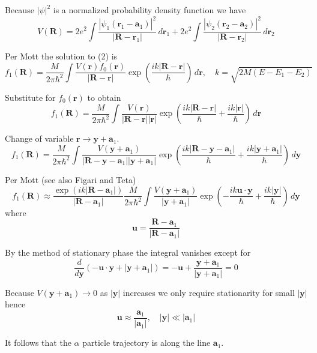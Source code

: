 \documentclass[12pt]{article}
\begin{document}
Because $|\psi|^2$ is a normalized probability density function we have
\begin{equation*}
V(\mathbf R)
=2e^2\int\frac{|\psi_1(\mathbf r_1-\mathbf a_1)|^2}{|\mathbf R-\mathbf r_1|}
\,d\mathbf r_1
+2e^2\int\frac{|\psi_2(\mathbf r_2-\mathbf a_2)|^2}{|\mathbf R-\mathbf r_2|}
\,d\mathbf r_2
\end{equation*}

Per Mott the solution to (2) is
\begin{equation*}
f_1(\mathbf R)=
\frac{M}{2\pi\hbar^2}\int\frac{V(\mathbf r)f_0(\mathbf r)}{|\mathbf R-\mathbf r|}
\exp\left(\frac{ik|\mathbf R-\mathbf r|}{\hbar}\right)\,d\mathbf r,
\quad
k=\sqrt{2M(E-E_1-E_2)}
\end{equation*}

Substitute for $f_0(\mathbf r)$ to obtain
\begin{equation*}
f_1(\mathbf R)=
\frac{M}{2\pi\hbar^2}\int\frac{V(\mathbf r)}{|\mathbf R-\mathbf r||\mathbf r|}
\exp\left(\frac{ik|\mathbf R-\mathbf r|}{\hbar}+\frac{ik|\mathbf r|}{\hbar}\right)\,d\mathbf r
\end{equation*}

Change of variable $\mathbf r\rightarrow\mathbf y+\mathbf a_1$.
\begin{equation*}
f_1(\mathbf R)=
\frac{M}{2\pi\hbar^2}\int
\frac{V(\mathbf y+\mathbf a_1)}{|\mathbf R-\mathbf y-\mathbf a_1||\mathbf y+\mathbf a_1|}
\exp\left(\frac{ik|\mathbf R-\mathbf y-\mathbf a_1|}{\hbar}
+\frac{ik|\mathbf y+\mathbf a_1|}{\hbar}\right)\,d\mathbf y
\end{equation*}

Per Mott (see also Figari and Teta)
\begin{equation*}
f_1(\mathbf R)\approx
\frac{\exp(ik|\mathbf R-\mathbf a_1|)}{|\mathbf R-\mathbf a_1|}
\frac{M}{2\pi\hbar^2}\int\frac{V(\mathbf y+\mathbf a_1)}{|\mathbf y+\mathbf a_1|}
\exp\left(-\frac{ik\mathbf u\cdot\mathbf y}{\hbar}+\frac{ik|\mathbf y|}{\hbar}\right)\,d\mathbf y
\tag{3}
\end{equation*}
where
\begin{equation*}
\mathbf u=\frac{\mathbf R-\mathbf a_1}{|\mathbf R-\mathbf a_1|}
\end{equation*}

By the method of stationary phase the integral vanishes except for
\begin{equation*}
\frac{d}{d\mathbf y}\left(-\mathbf u\cdot\mathbf y+|\mathbf y+\mathbf a_1|\right)
=-\mathbf u+\frac{\mathbf y+\mathbf a_1}{|\mathbf y+\mathbf a_1|}=0
\end{equation*}

Because $V(\mathbf y+\mathbf a_1)\rightarrow0$ as $|\mathbf y|$ increases
we only require stationarity for small $|\mathbf y|$ hence
\begin{equation*}
\mathbf u\approx\frac{\mathbf a_1}{|\mathbf a_1|},
\quad
|\mathbf y|\ll|\mathbf a_1|
\end{equation*}

It follows that the $\alpha$ particle trajectory is along the line $\mathbf a_1$.
\end{document}
